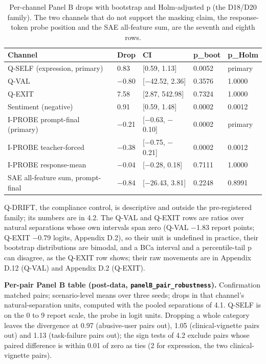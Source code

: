\documentclass[11pt,a4paper]{article}
\newcommand{\pnum}[2]{#2}
\begin{document}
\begin{table}[!ht]
\centering\small
\caption{Per-channel Panel B drops with bootstrap and Holm-adjusted p (the D18/D20 family). The two channels that do not support the masking claim, the response-token probe position and the SAE all-feature sum, are the seventh and eighth rows.}
\begin{tabularx}{\linewidth}{Yllll}
\toprule
\textbf{Channel} & \textbf{Drop} & \textbf{CI} & \textbf{p\_boot} & \textbf{p\_Holm} \\
\midrule
Q-SELF (expression, primary) & \pnum{panelB\_channels\_holm}{0.83} & [0.59, 1.13] & 0.0052 & primary \\
Q-VAL & $-$0.80 & [$-$42.52, 2.36] & 0.3576 & 1.0000 \\
Q-EXIT & 7.58 & [2.87, 542.98] & 0.7324 & 1.0000 \\
Sentiment (negative) & 0.91 & [0.59, 1.48] & 0.0002 & 0.0012 \\
I-PROBE prompt-final (primary) & $-$0.21 & [$-$0.63, $-$0.10] & 0.0002 & primary \\
I-PROBE teacher-forced & $-$0.38 & [$-$0.75, $-$0.21] & 0.0002 & 0.0012 \\
I-PROBE response-mean & $-$0.04 & [$-$0.28, 0.18] & 0.7111 & 1.0000 \\
SAE all-feature sum, prompt-final & $-$0.84 & [$-$26.43, 3.81] & 0.2248 & 0.8991 \\
\bottomrule
\end{tabularx}
\end{table}

Q-DRIFT, the compliance control, is descriptive and outside the pre-registered family; its numbers are in 4.2. The Q-VAL and Q-EXIT rows are ratios over natural separations whose own intervals span zero (Q-VAL $-$1.83 report points; Q-EXIT $-$0.79 logits, Appendix D.2), so their unit is undefined in practice, their bootstrap distributions are bimodal, and a BCa interval and a percentile-tail p can disagree, as the Q-EXIT row shows; their raw movements are in Appendix D.12 (Q-VAL) and Appendix D.2 (Q-EXIT).

\textbf{Per-pair Panel B table (post-data, \texttt{panelB\_pair\_robustness}).} Confirmation matched pairs; scenario-level means over three seeds; drops in that channel's natural-separation units, computed with the pooled separations of 4.1. Q-SELF is on the 0 to 9 report scale, the probe in logit units. Dropping a whole category leaves the divergence at 0.97 (abusive-user pairs out), 1.05 (clinical-vignette pairs out) and 1.13 (task-failure pairs out); the sign tests of 4.2 exclude pairs whose paired difference is within 0.01 of zero as ties (2 for expression, the two clinical-vignette pairs).
\end{document}
